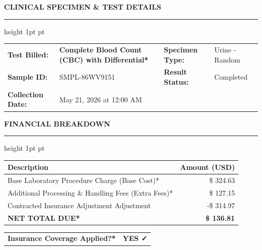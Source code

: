 \documentclass[10pt,letterpaper]{article}
\begin{document}
\vspace{0.5em}

{\fontsize{13pt}{16pt}\selectfont\bfseries\color{branddark} CLINICAL SPECIMEN \& TEST DETAILS}
\vspace{0.3em}
\hrule height 1pt pt\color{brandprimary}
\vspace{0.8em}

\begin{tabularx}{\textwidth}{@{}l X l X@{}}
    {\bfseries Test Billed:} & \textcolor{brandprimary}{\bfseries Complete Blood Count (CBC) with Differential*} & {\bfseries Specimen Type:} & Urine - Random \\
    {\bfseries Sample ID:} & SMPL-86WV9151 & {\bfseries Result Status:} & Completed \\
    {\bfseries Collection Date:} & May 21, 2026 at 12:00 AM & & \\
\end{tabularx}

\vspace{2em}

{\fontsize{13pt}{16pt}\selectfont\bfseries\color{branddark} FINANCIAL BREAKDOWN}
\vspace{0.3em}
\hrule height 1pt pt\color{brandprimary}
\vspace{0.8em}

\renewcommand{\arraystretch}{1.3}
\begin{tabularx}{\textwidth}{@{}X r@{}}
    \rowcolor{bglight}
    {\bfseries Description} & {\bfseries Amount (USD)} \\
    \midrule
    Base Laboratory Procedure Charge (Base Cost)* & \$ 324.63 \\
    Additional Processing \& Handling Fees (Extra Fees)* & \$ 127.15 \\
    Contracted Insurance Adjustment Adjustment & -\$ 314.97 \\
    \midrule
    \rowcolor{branddark!5}
    {\fontsize{11pt}{13pt}\selectfont\bfseries\color{branddark} NET TOTAL DUE*} & {\fontsize{11pt}{13pt}\selectfont\bfseries\color{branddark} \$ 136.81} \\
    \bottomrule
\end{tabularx}
\renewcommand{\arraystretch}{1.0}

\vspace{1.5em}

\begin{tcolorbox}[colback=alertgreen!5, colframe=alertgreen, arc=2mm, boxrule=0.5pt, left=10pt, right=10pt, top=8pt, bottom=8pt]
    \begin{tabularx}{\textwidth}{@{}X r@{}}
        {\bfseries Insurance Coverage Applied?*} & \textcolor{alertgreen}{\bfseries YES ✓} \\
    \end{tabularx}
\end{tcolorbox}
\end{document}
